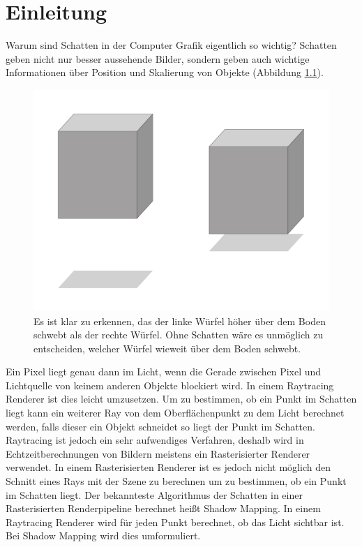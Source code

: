

\chapter{Einleitung}
\label{ch:Introduction}
Warum sind Schatten in der Computer Grafik eigentlich so wichtig?
Schatten geben nicht nur besser aussehende Bilder, sondern geben auch wichtige Informationen über Position und Skalierung von Objekte
(Abbildung \ref{fig:why-shadows}).

\begin{figure}[H]
	\begin{center}
		\includegraphics[width=.3\textwidth]{res/img/why-shadows.jpg}
    \caption{Es ist klar zu erkennen, das der linke Würfel höher über dem Boden schwebt als der rechte Würfel. 
    Ohne Schatten wäre es unmöglich zu entscheiden, welcher Würfel wieweit über dem Boden schwebt.}
	\end{center}
	\label{fig:why-shadows}
\end{figure}
Ein Pixel liegt genau dann im Licht, wenn die Gerade zwischen Pixel 
und Lichtquelle von keinem anderen Objekte blockiert wird.
In einem Raytracing Renderer ist dies leicht umzusetzen. 
Um zu bestimmen, ob ein Punkt im Schatten liegt kann ein weiterer Ray von dem Oberflächenpunkt zu dem Licht berechnet werden, 
falls dieser ein Objekt schneidet so liegt der Punkt im Schatten.
Raytracing ist jedoch ein sehr aufwendiges Verfahren, deshalb wird in Echtzeitberechnungen von Bildern meistens
ein Rasterisierter Renderer verwendet.
In einem Rasterisierten Renderer ist es jedoch nicht möglich den Schnitt eines Rays mit der Szene
zu berechnen um zu bestimmen, ob ein Punkt im Schatten liegt.
\newline 
\newline
Der bekannteste Algorithmus der Schatten in einer Rasterisierten Renderpipeline 
berechnet heißt Shadow Mapping.
In einem Raytracing Renderer wird für jeden Punkt berechnet, ob das Licht sichtbar ist.
Bei Shadow Mapping wird dies umformuliert. 
